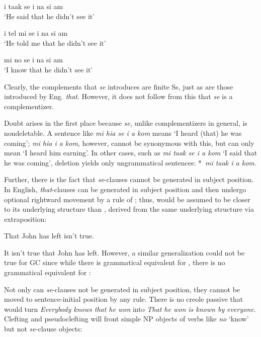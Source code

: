 \ea\label{ex:2:162}
i taak se i na si am \\
\glt `He said that he didn't see it'
\z

\ea\label{ex:2:163}
 i tel mi se i na si am\\
\glt `He told me that he didn't see it'
\z

\ea\label{ex:2:164}
mi no se i na si am\\
\glt `I know that he didn't see it'
\z

\noindent Clearly, the complements that \textit{se} introduces are finite Ss, just as are those introduced by Eng. \textit{that}. However, it does not follow from this that \textit{se} is a complementizer.

Doubt arises in the first place because \textit{se}, unlike complementizers in general, is nondeletable. A sentence like \textit{mi hia se i a kom} means `I heard (that) he was coming'; \textit{mi hia i a kom}, however, cannot be synonymous with this, but can only mean `I heard him earning'. In other cases, such as \textit{mi taak se i a kom} `I said that he was coming', deletion yields only ungrammatical sentences: *~\textit{mi taak i a kom.}

Further, there is the fact that {\itshape se}-clauses cannot be generated in subject position. In English, \textit{that}-clauses can be generated in subject position and then undergo optional rightward movement by a rule of ; thus,  would be assumed to be closer to its underlying structure than , derived from the same underlying structure via extraposition:

\ea\label{ex:2:165}
That John has left isn't true.
\z

\ea\label{ex:2:166}
It isn't true that John has left.
\z
However, a similar generalization could not be true for GC since while there is grammatical equivalent for , there is no grammatical equivalent for :


\z

\z

Not only can \textit{se}-clauses not be generated in subject position, they cannot be moved to sentence-initial position by any rule. There is no creole passive that would turn \textit{Everybody knows that he won} into \textit{That he won is known by everyone}. Clefting and pseudoclefting will front simple NP objects of verbs like \textit{no} `know' but not \textit{se}-clause objects: 

